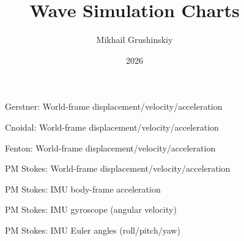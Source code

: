 \documentclass[11pt,letterpaper]{article}
\title{Wave Simulation Charts}
\author{Mikhail Grushinskiy}
\date{2026}
\begin{document}
    \maketitle


    \begin{figure}[H]\centering
    \resizebox{\textwidth}{!}{}
    \caption{Gerstner: World-frame displacement/velocity/acceleration}
    \label{fig:gerstner_world}
    \end{figure}

    \begin{figure}[H]\centering
    \resizebox{\textwidth}{!}{}
    \caption{Cnoidal: World-frame displacement/velocity/acceleration}
    \label{fig:cnoidal_world}
    \end{figure}

    \begin{figure}[H]\centering
    \resizebox{\textwidth}{!}{}
    \caption{Fenton: World-frame displacement/velocity/acceleration}
    \label{fig:fenton_world}
    \end{figure}

    \begin{figure}[H]\centering
    \resizebox{\textwidth}{!}{}
    \caption{PM Stokes: World-frame displacement/velocity/acceleration}
    \label{fig:pmstokes_world}
    \end{figure}

    \begin{figure}[H]\centering
    \resizebox{\textwidth}{!}{}
    \caption{PM Stokes: IMU body-frame acceleration}
    \label{fig:pmstokes_imu_acc}
    \end{figure}

    \begin{figure}[H]\centering
    \resizebox{\textwidth}{!}{}
    \caption{PM Stokes: IMU gyroscope (angular velocity)}
    \label{fig:pmstokes_imu_gyro}
    \end{figure}

    \begin{figure}[H]\centering
    \resizebox{\textwidth}{!}{}
    \caption{PM Stokes: IMU Euler angles (roll/pitch/yaw)}
    \label{fig:pmstokes_euler}
    \end{figure}
\end{document}
